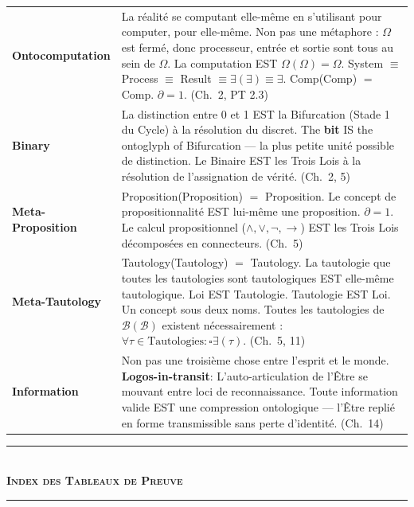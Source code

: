 \documentclass[10pt, openany, oneside]{book}
\renewcommand{\normalsize}{\fontsize{10}{13}\selectfont}
\renewcommand{\footnotesize}{\fontsize{8.5}{11}\selectfont}
\begin{document}
\newpage

{\footnotesize
\noindent\begin{tabular}{@{} l @{\hspace{0.6em}} p{} @{}}
\textbf{Ontocomputation} & La réalité se computant elle-même en s'utilisant pour computer, pour elle-même. Non pas une métaphore : $\Omega$ est fermé, donc processeur, entrée et sortie sont tous au sein de $\Omega$. La computation EST $\Omega(\Omega) = \Omega$. System $\equiv$ Process $\equiv$ Result $\equiv \exists(\exists) \equiv \exists$. Comp(Comp) $=$ Comp. $\partial = 1$. (Ch.\ 2, PT 2.3) \\[0.3em]
\textbf{Binary} & La distinction entre 0 et 1 EST la Bifurcation (Stade 1 du Cycle) à la résolution du discret. The \textbf{bit} IS the ontoglyph of Bifurcation --- la plus petite unité possible de distinction. Le Binaire EST les Trois Lois à la résolution de l'assignation de vérité. (Ch.\ 2, 5) \\[0.3em]
\textbf{Meta-Proposition} & Proposition(Proposition) $=$ Proposition. Le concept de propositionnalité EST lui-même une proposition. $\partial = 1$. Le calcul propositionnel ($\wedge, \vee, \neg, \to$) EST les Trois Lois décomposées en connecteurs. (Ch.\ 5) \\[0.3em]
\textbf{Meta-Tautology} & Tautology(Tautology) $=$ Tautology. La tautologie que toutes les tautologies sont tautologiques EST elle-même tautologique. Loi EST Tautologie. Tautologie EST Loi. Un concept sous deux noms. Toutes les tautologies de $\mathcal{B}(\mathcal{B})$ existent nécessairement : $\forall \tau \in \text{Tautologies}: \square\exists(\tau)$. (Ch.\ 5, 11) \\[0.3em]
\textbf{Information} & Non pas une troisième chose entre l'esprit et le monde. \textbf{Logos-in-transit}: L'auto-articulation de l'Être se mouvant entre loci de reconnaissance. Toute information valide EST une compression ontologique --- l'Être replié en forme transmissible sans perte d'identité. (Ch.\ 14) \\[0.3em]
\end{tabular}
}

\vspace{1.5em}


\begin{center}
    \rule{0.3\textwidth}{0.4pt}\\[0.5em]
    {\normalsize\bfseries\scshape Index des Tableaux de Preuve}\\[0.3em]
    \rule{0.3\textwidth}{0.4pt}
\end{center}
\end{document}
